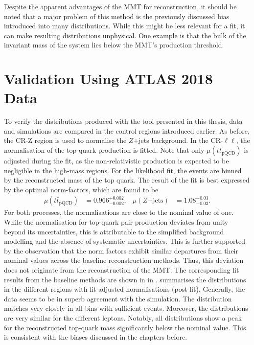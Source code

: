 Despite the apparent advantages of the MMT for reconstruction, it should be noted that a major problem of this method is the previously discussed bias introduced into many distributions. While this might be less relevant for a fit, it can make resulting distributions unphysical. One example is that the bulk of the invariant mass of the \ttbar system lies below the MMT's production threshold.

\section{Validation Using ATLAS 2018 Data}
\label{sec:results}
To verify the distributions produced with the tool presented in this thesis, data and simulations are compared in the control regions introduced earlier. As before, the CR-Z region is used to normalise the $Z$+jets background.
In the CR-$\ell\ell$, the normalisation of the top-quark production is fitted. Note that only $\mu(t\bar{t}_{\text{pQCD}})$ is adjusted during the fit, as the non-relativistic production is expected to be negligible in the high-mass regions. For the likelihood fit, the events are binned by the reconstructed mass of the top quark. The result of the fit is best expressed by the optimal norm-factors, which are found to be 
\begin{align}
    \mu(t\bar{t}_{\text{pQCD}})&=0.966^{+0.002}_{-0.002},&
    \mu(Z\text{+jets})&=1.08^{+0.03}_{-0.03}.
    \label{eg:data_validation:results}
\end{align}
For both processes, the normalisations are close to the nominal value of one. While the normalisation for top-quark pair production deviates from unity beyond its uncertainties, this is attributable to the simplified background modelling and the absence of systematic uncertainties. This is further supported by the observation that the norm factors exhibit similar departures from their nominal values across the baseline reconstruction methods. Thus, this deviation does not originate from the reconstruction of the MMT. The corresponding fit results from the baseline methods are shown in  in .  summarises the distributions in the different regions with fit-adjusted normalisations (post-fit). Generally, the data seems to be in superb agreement with the simulation. The distribution matches very closely in all bins with sufficient events. Moreover, the distributions are very similar for the different leptons. Notably, all distributions show a peak for the reconstructed top-quark mass significantly below the nominal value. This is consistent with the biases discussed in the chapters before.

